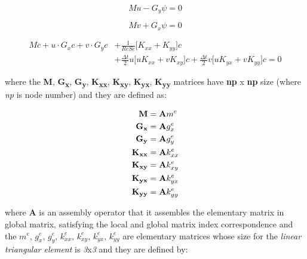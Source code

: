 \begin{equation}
 Mu - G_y \psi = 0
\end{equation}

\begin{equation}
 Mv + G_x \psi = 0
\end{equation}

\begin{equation}
\begin{aligned}
 M \overset{.}{c} + u \cdot G_x c + v \cdot G_y c & + \frac{1}{\textit{ReSc}} \Big[ K_{xx} + K_{yy} \Big] c
 \\[5pt]
 & + \frac{\Delta t}{2} u \Big[ u K_{xx} + v K_{xy} \Big] c
 + \frac{\Delta t}{2} v \Big[ u K_{yx} + v K_{yy} \Big] c 
 = 0 \label{concentration matrix}
\end{aligned} 
\end{equation}

\medskip
\noindent
where the \textbf{M}, \textbf{G\textsubscript{x}}, 
\textbf{G\textsubscript{y}}, \textbf{K\textsubscript{xx}},
\textbf{K\textsubscript{xy}},
\textbf{K\textsubscript{yx}}, 
\textbf{K\textsubscript{yy}} matrices
have \textbf{np} x \textbf{np} size
(where \textit{np} is node number) and
they are defined as:

\begin{align}
  \textbf{M} & = \textbf{A} m^{e}\\
  \textbf{G\textsubscript{x}} & = \textbf{A} g_{x}^{e}\\
  \textbf{G\textsubscript{y}} & = \textbf{A} g_{y}^{e} \\
  \textbf{K\textsubscript{xx}} & = \textbf{A} k_{xx}^{e} \\
  \textbf{K\textsubscript{xy}} & = \textbf{A} k_{xy}^{e} \\
  \textbf{K\textsubscript{yx}} & = \textbf{A} k_{yx}^{e} \\
  \textbf{K\textsubscript{yy}} & = \textbf{A} k_{yy}^{e}
\end{align}

\noindent
where \textbf{A} is an assembly operator
that it assembles the elementary matrix in
global matrix, satisfying the local and global matrix index
correspondence and the
$m^{e}$, 
$g^{e}_{x}$,
$g^{e}_{y}$,
$k^{e}_{xx}$,
$k^{e}_{xy}$,
$k^{e}_{yx}$,
$k^{e}_{yy}$
are elementary matrices whose
size for the  
\textit{linear triangular element} is \textit{3}x\textit{3} and
they are defined by:


